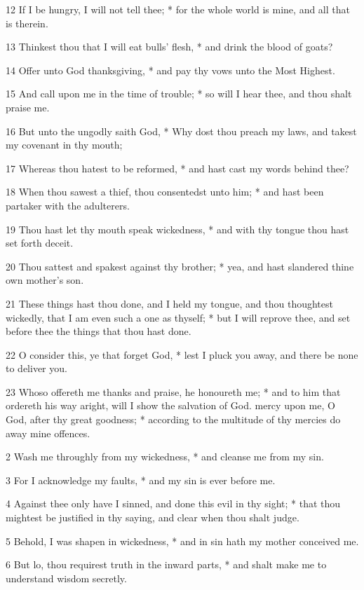 12 If I be hungry, I will not tell thee; * for the whole world is mine, and all that is therein.\par
13 Thinkest thou that I will eat bulls' flesh, * and drink the blood of goats?\par
14 Offer unto God thanksgiving, * and pay thy vows unto the Most Highest.\par
15 And call upon me in the time of trouble; * so will I hear thee, and thou shalt praise me.\par
16 But unto the ungodly saith God, * Why dost thou preach my laws, and takest my covenant in thy mouth;\par
17 Whereas thou hatest to be reformed, * and hast cast my words behind thee?\par
18 When thou sawest a thief, thou consentedst unto him; * and hast been partaker with the adulterers.\par
19 Thou hast let thy mouth speak wickedness, * and with thy tongue thou hast set forth deceit.\par
20 Thou sattest and spakest against thy brother; * yea, and hast slandered thine own mother's son.\par
21 These things hast thou done, and I held my tongue, and thou thoughtest wickedly, that I am even such a one as thyself; * but I will reprove thee, and set before thee the things that thou hast done.\par
22 O consider this, ye that forget God, * lest I pluck you away, and there be none to deliver you.\par
23 Whoso offereth me thanks and praise, he honoureth me; * and to him that ordereth his way aright, will I show the salvation of God.
 mercy upon me, O God, after thy great goodness; * according to the multitude of thy mercies do away mine offences.\par
2 Wash me throughly from my wickedness, * and cleanse me from my sin.\par
3 For I acknowledge my faults, * and my sin is ever before me.\par
4 Against thee only have I sinned, and done this evil in thy sight; * that thou mightest be justified in thy saying, and clear when thou shalt judge.\par
5 Behold, I was shapen in wickedness, * and in sin hath my mother conceived me.\par
6 But lo, thou requirest truth in the inward parts, * and shalt make me to understand wisdom secretly.\par
